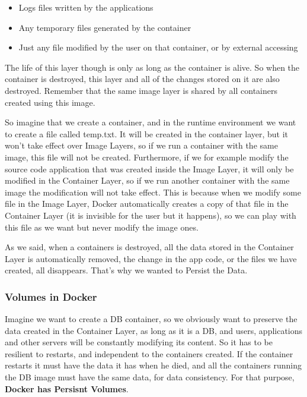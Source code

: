 \documentclass{article}
\begin{document}
\begin{itemize}
    \item Logs files written by the applications
    \item Any temporary files generated by the container
    \item Just any file modified by the user on that container, or by external accessing
\end{itemize}

The life of this layer though is only as long as the container is alive. So when the container is destroyed, this layer and all of the changes stored on it are also destroyed. Remember that the same image layer is shared by all containers created using this image.

So imagine that we create a container, and in the runtime environment we want to create a file called temp.txt. It will be created in the container layer, but it won't take effect over Image Layers, so if we run a container with the same image, this file will not be created. Furthermore, if we for example modify the source code application that was created inside the Image Layer, it will only be modified in the Container Layer, so if we run another container with the same image the modification will not take effect. This is because when we modify some file in the Image Layer, Docker automatically creates a copy of that file in the Container Layer (it is invisible for the user but it happens), so we can play with this file as we want but never modify the image ones.

As we said, when a containers is destroyed, all the data stored in the Container Layer is automatically removed, the change in the app code, or the files we have created, all disappears. That's why we wanted to Persist the Data.

\subsubsection{Volumes in Docker}
\label{dockmount}
Imagine we want to create a DB container, so we obviously want to preserve the data created in the Container Layer, as long as it is a DB, and users, applications and other servers will be constantly modifying its content. So it has to be resilient to restarts, and independent to the containers created. If the container restarts it must have the data it has when he died, and all the containers running the DB image must have the same data, for data consistency. For that purpose, \textbf{Docker has Persisnt Volumes}.
\end{document}
